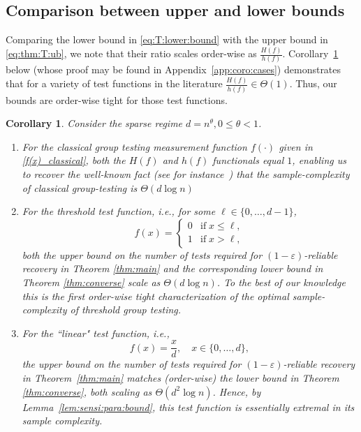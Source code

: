 \documentclass[onecolumn,letterpaper]{IEEEtran}
\newtheorem{corollary}{Corollary}
\newcommand{\ts}{{\ell}}
\newcommand{\fh}{{h(f)}}
\newcommand{\fH}{{H(f)}}
\begin{document}
\subsection{Comparison between upper and lower bounds}\label{subsec:comp}
Comparing the lower bound in \eqref{eq:T:lower:bound} with the upper bound in \eqref{eq:thm:T:ub}, we note that their ratio scales order-wise as $\frac{\fH}{\fh}$. Corollary~\ref{coro:special:cases} below (whose proof may be found in Appendix~\ref{app:coro:cases}) demonstrates that for a variety of test functions in the literature $\frac{\fH}{\fh}\in \Theta\left(1\right)$. Thus, our bounds are order-wise tight for those test functions. 
\begin{corollary}
\label{coro:special:cases}
Consider the sparse regime $d=n^\theta, 0\leq\theta <1$.
\begin{enumerate}[label=\alph*)]
    \item \label{coro_classical}For the classical group testing measurement function $f(\cdot)$ given in \eqref{f(x)_classical}, both the $\fH$ and $\fh$ functionals equal $1$, enabling us to recover the well-known fact (see for instance~\cite{sid2014}) that the sample-complexity of classical group-testing is $\Theta(d\log n)$ %
    \item \label{coro_threshold}For the threshold test function, i.e., for some $\ell\in\{0,\dots, d-1\}$, 
\begin{equation} 
\label{eq:threshold:function}
    f(x) = 
    \left\{
    \begin{array}{ll}
    0 & \text{if} \; x \le \ts, \\
    1 & \text{if} \; x > \ts,
    \end{array} 
    \right.
\end{equation}
both the upper bound on the number of tests required for $(1-\varepsilon)$-reliable recovery in Theorem \ref{thm:main} and the corresponding lower bound in Theorem \ref{thm:converse} scale as $\Theta \left(d\log n\right)$. {To the best of our knowledge this is the first order-wise tight characterization of the optimal sample-complexity of threshold group testing.}
\item \label{coro_linear}For the ``linear" test function, i.e., 
\begin{equation}
\label{eq:linear:function}
    f(x) = \frac{x}{d}, \quad x\in\{0,\dots,d\},
\end{equation} 
the upper bound on the number of tests required for $(1-\varepsilon)$-reliable recovery in Theorem~\ref{thm:main} matches (order-wise) the lower bound in Theorem \ref{thm:converse},  both scaling as $\Theta \left(d^2\log n\right)$. Hence, by Lemma~\ref{lem:sensi:para:bound}, this test function is essentially extremal in its sample complexity. 
\end{enumerate}
\end{corollary}
\end{document}

